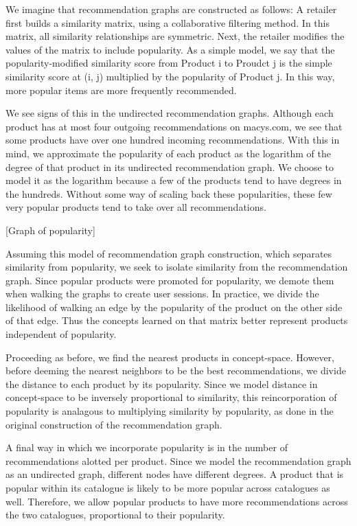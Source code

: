 \documentclass[11pt]{article}
\begin{document}
We imagine that recommendation graphs are constructed as follows: A retailer first
builds a similarity matrix, using a collaborative filtering method. In this
matrix, all similarity relationships are symmetric. Next, the retailer modifies
the values of the matrix to include popularity. As a simple model, we say that
the popularity-modified similarity score from Product i to Proudct j is the
simple similarity score at (i, j) multiplied by the popularity of Product j. In
this way, more popular items are more frequently recommended. 

We see signs of this in the undirected recommendation graphs. Although each product
has at most four outgoing recommendations on macys.com, we see that some
products have over one hundred incoming recommendations. With this in mind, we
approximate the popularity of each product as the logarithm of the degree of
that product in its undirected recommendation graph. We choose to model it as the
logarithm because a few of the products tend to have degrees in the hundreds.
Without some way of scaling back these popularities, these few very popular
products tend to take over all recommendations.

[Graph of popularity]

Assuming this model of recommendation graph construction, which separates similarity
from popularity, we seek to isolate similarity from the recommendation graph. Since
popular products were promoted for popularity, we demote them when walking the
graphs to create user sessions. In practice, we divide the likelihood of walking
an edge by the popularity of the product on the other side of that edge. Thus
the concepts learned on that matrix better represent products independent of
popularity. 

Proceeding as before, we find the nearest products in concept-space. However,
before deeming the nearest neighbors to be the best recommendations, we divide
the distance to each product by its popularity. Since we model distance in 
concept-space to be inversely proportional to similarity, this reincorporation
of popularity is analagous to multiplying similarity by popularity, as done in
the original construction of the recommendation graph.

A final way in which we incorporate popularity is in the number of
recommendations alotted per product. Since we model the recommendation graph as an
undirected graph, different nodes have different degrees. A product that is
popular within its catalogue is likely to be more popular across catalogues as
well. Therefore, we allow popular products to have more recommendations across
the two catalogues, proportional to their popularity.
\end{document}
